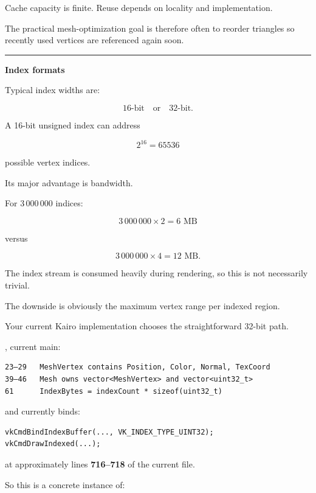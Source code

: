 Cache capacity is finite. Reuse depends on locality and implementation.

The practical mesh-optimization goal is therefore often to reorder triangles so recently used vertices are referenced again soon.

\begin{center}\rule{0.5\linewidth}{0.5pt}\end{center}

\textbf{Index formats}

Typical index widths are:

\[
16\text{-bit} \quad \text{or} \quad 32\text{-bit}.
\]

A 16-bit unsigned index can address

\[
2^{16}=65536
\]

possible vertex indices.

Its major advantage is bandwidth.

For \(3\,000\,000\) indices:

\[
3\,000\,000\times2 = 6\text{ MB}
\]

versus

\[
3\,000\,000\times4 = 12\text{ MB}.
\]

The index stream is consumed heavily during rendering, so this is not necessarily trivial.

The downside is obviously the maximum vertex range per indexed region.

Your current Kairo implementation chooses the straightforward 32-bit path.

, current main:

\begin{verbatim}
23–29   MeshVertex contains Position, Color, Normal, TexCoord
39–46   Mesh owns vector<MeshVertex> and vector<uint32_t>
61      IndexBytes = indexCount * sizeof(uint32_t)
\end{verbatim}

and  currently binds:

\begin{verbatim}
vkCmdBindIndexBuffer(..., VK_INDEX_TYPE_UINT32);
vkCmdDrawIndexed(...);
\end{verbatim}

at approximately lines \textbf{716--718} of the current file.

So this is a concrete instance of:

